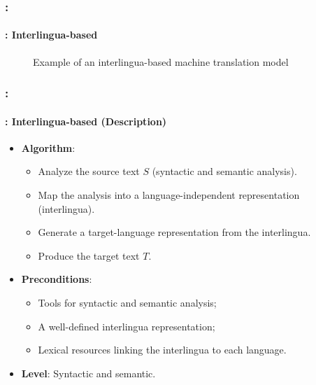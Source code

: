 \documentclass[xcolor=table]{beamer}
\begin{document}
\begin{frame}
	\frametitle{\insertshortsubtitle: \insertsection}
	\framesubtitle{\insertsubsection: Interlingua-based}
	
	\begin{figure}
		\centering
		\caption{Example of an interlingua-based machine translation model \cite{06-quah}}
	\end{figure}

\end{frame}

\begin{frame}
	\frametitle{\insertshortsubtitle: \insertsection}
	\framesubtitle{\insertsubsection: Interlingua-based (Description)}
	
	\begin{itemize}
		\item \textbf{Algorithm}:
		\begin{itemize}
			\item Analyze the source text $S$ (syntactic and semantic analysis).
			\item Map the analysis into a language-independent representation (interlingua).
			\item Generate a target-language representation from the interlingua.
			\item Produce the target text $T$.
		\end{itemize}
		\item \textbf{Preconditions}:
		\begin{itemize}
			\item Tools for syntactic and semantic analysis;
			\item A well-defined interlingua representation;
			\item Lexical resources linking the interlingua to each language.
		\end{itemize}
		\item \textbf{Level}: Syntactic and semantic.
	\end{itemize}
	
\end{frame}
\end{document}
